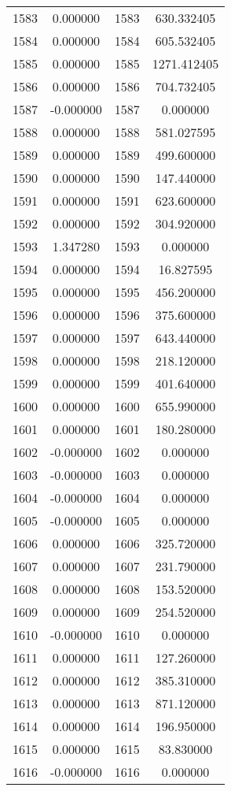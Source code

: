 \documentclass[12pt]{article}
\begin{document}
\begin{longtable}{@{}cccc@{}}
1583 & 0.000000 & 1583 & 630.332405 \\
1584 & 0.000000 & 1584 & 605.532405 \\
1585 & 0.000000 & 1585 & 1271.412405 \\
1586 & 0.000000 & 1586 & 704.732405 \\
1587 & -0.000000 & 1587 & 0.000000 \\
1588 & 0.000000 & 1588 & 581.027595 \\
1589 & 0.000000 & 1589 & 499.600000 \\
1590 & 0.000000 & 1590 & 147.440000 \\
1591 & 0.000000 & 1591 & 623.600000 \\
1592 & 0.000000 & 1592 & 304.920000 \\
1593 & 1.347280 & 1593 & 0.000000 \\
1594 & 0.000000 & 1594 & 16.827595 \\
1595 & 0.000000 & 1595 & 456.200000 \\
1596 & 0.000000 & 1596 & 375.600000 \\
1597 & 0.000000 & 1597 & 643.440000 \\
1598 & 0.000000 & 1598 & 218.120000 \\
1599 & 0.000000 & 1599 & 401.640000 \\
1600 & 0.000000 & 1600 & 655.990000 \\
1601 & 0.000000 & 1601 & 180.280000 \\
1602 & -0.000000 & 1602 & 0.000000 \\
1603 & -0.000000 & 1603 & 0.000000 \\
1604 & -0.000000 & 1604 & 0.000000 \\
1605 & -0.000000 & 1605 & 0.000000 \\
1606 & 0.000000 & 1606 & 325.720000 \\
1607 & 0.000000 & 1607 & 231.790000 \\
1608 & 0.000000 & 1608 & 153.520000 \\
1609 & 0.000000 & 1609 & 254.520000 \\
1610 & -0.000000 & 1610 & 0.000000 \\
1611 & 0.000000 & 1611 & 127.260000 \\
1612 & 0.000000 & 1612 & 385.310000 \\
1613 & 0.000000 & 1613 & 871.120000 \\
1614 & 0.000000 & 1614 & 196.950000 \\
1615 & 0.000000 & 1615 & 83.830000 \\
1616 & -0.000000 & 1616 & 0.000000 \\

\end{longtable}
\end{document}
